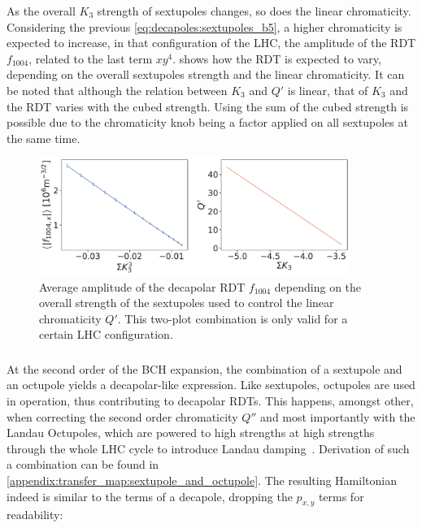 As the overall $K_3$ strength of sextupoles changes, so does the linear chromaticity. 
Considering the previous \cref{eq:decapoles:sextupoles_b5}, a higher chromaticity
is expected to increase, in that configuration of the LHC, the amplitude of the RDT $f_{1004}$,
related to the last term $xy^4$.  shows how the RDT is
expected to vary, depending on the overall sextupoles strength and the linear chromaticity. It can
be noted that although the relation between $K_3$ and $Q'$ is linear, that of $K_3$ and the RDT
varies with the cubed strength. Using the sum of the cubed strength is possible due to the
chromaticity knob being a factor applied on all sextupoles at the same time.

\begin{figure}[!htb]
    \centering
    \includegraphics[width=0.9\textwidth]{./images/f1004/avg_f1004_k3.pdf}
    \caption{Average amplitude of the decapolar RDT $f_{1004}$ depending on the overall strength
    of the sextupoles used to control the linear chromaticity $Q'$. This two-plot combination is
    only valid for a certain LHC configuration.}
    \label{fig:decapoles:sextupoles_k3_f1004}
\end{figure}




\subsubsection{}


At the second order of the BCH expansion, the combination of a sextupole and an octupole yields a
decapolar-like expression.
Like sextupoles, octupoles are used in operation, thus contributing to decapolar RDTs. This
happens, amongst other, when correcting the second order chromaticity $Q''$ and most importantly with
the Landau Octupoles, which are powered to high strengths at high strengths through the whole LHC
cycle to introduce Landau damping~\cite{gareyte_landau_1997}.
Derivation of such a combination can be found in
\cref{appendix:transfer_map:sextupole_and_octupole}. The resulting Hamiltonian indeed is similar to
the terms of a decapole, dropping the $p_{x,y}$ terms for readability:

